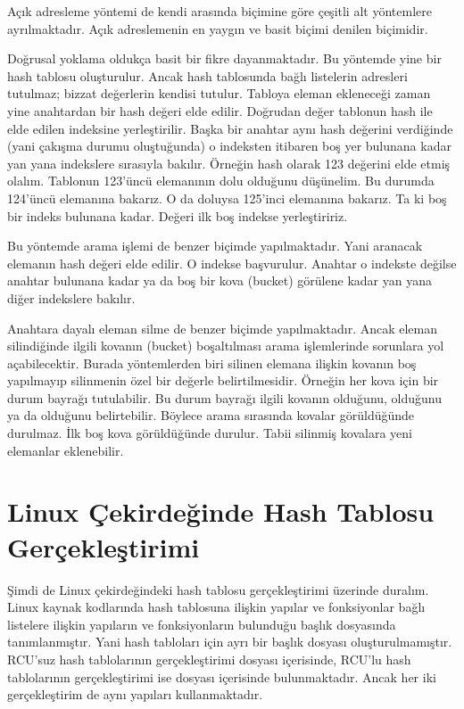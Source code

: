 \documentclass[a4paper,10pt,turkish]{sphinxmanual}
\begin{document}
\sphinxAtStartPar
Açık adresleme yöntemi de kendi arasında  biçimine göre çeşitli alt
yöntemlere ayrılmaktadır. Açık adreslemenin en yaygın ve basit biçimi  denilen biçimidir.

\sphinxAtStartPar
Doğrusal yoklama oldukça basit bir fikre dayanmaktadır. Bu yöntemde yine bir hash tablosu
oluşturulur. Ancak hash tablosunda bağlı listelerin adresleri tutulmaz; bizzat değerlerin
kendisi tutulur. Tabloya eleman ekleneceği zaman yine anahtardan bir hash değeri elde edilir.
Doğrudan değer tablonun hash ile elde edilen indeksine yerleştirilir. Başka bir anahtar aynı
hash değerini verdiğinde (yani çakışma durumu oluştuğunda) o indeksten itibaren boş yer
bulunana kadar yan yana indekslere sırasıyla bakılır. Örneğin hash olarak 123 değerini elde
etmiş olalım. Tablonun 123’üncü elemanının dolu olduğunu düşünelim. Bu durumda 124’üncü
elemanına bakarız. O da doluysa 125’inci elemanına bakarız. Ta ki boş bir indeks bulunana
kadar. Değeri ilk boş indekse yerleştiririz.

\sphinxAtStartPar
Bu yöntemde arama işlemi de benzer biçimde yapılmaktadır. Yani aranacak elemanın hash değeri
elde edilir. O indekse başvurulur. Anahtar o indekste değilse anahtar bulunana kadar ya da
boş bir kova (bucket) görülene kadar yan yana diğer indekslere bakılır.

\sphinxAtStartPar
Anahtara dayalı eleman silme de benzer biçimde yapılmaktadır. Ancak eleman silindiğinde
ilgili kovanın (bucket) boşaltılması arama işlemlerinde sorunlara yol açabilecektir. Burada
yöntemlerden biri silinen elemana ilişkin kovanın boş yapılmayıp silinmenin özel bir değerle
belirtilmesidir. Örneğin her kova için bir durum bayrağı tutulabilir. Bu durum bayrağı
ilgili kovanın  olduğunu,  olduğunu ya da  olduğunu belirtebilir.
Böylece arama sırasında  kovalar görüldüğünde durulmaz. İlk boş kova görüldüğünde
durulur. Tabii silinmiş kovalara yeni elemanlar eklenebilir.


\section{Linux Çekirdeğinde Hash Tablosu Gerçekleştirimi}
\label{\detokenize{kernellinkedlistandhashtable:linux-cekirdeginde-hash-tablosu-gerceklestirimi}}
\sphinxAtStartPar
Şimdi de Linux çekirdeğindeki hash tablosu gerçekleştirimi üzerinde duralım. Linux kaynak
kodlarında hash tablosuna ilişkin yapılar ve fonksiyonlar bağlı listelere ilişkin yapıların
ve fonksiyonların bulunduğu başlık dosyasında tanımlanmıştır. Yani hash tabloları için ayrı
bir başlık dosyası oluşturulmamıştır. RCU’suz hash tablolarının gerçekleştirimi
 dosyası içerisinde, RCU’lu hash tablolarının gerçekleştirimi ise
 dosyası içerisinde bulunmaktadır. Ancak her iki gerçekleştirim
de aynı yapıları kullanmaktadır.
\end{document}
